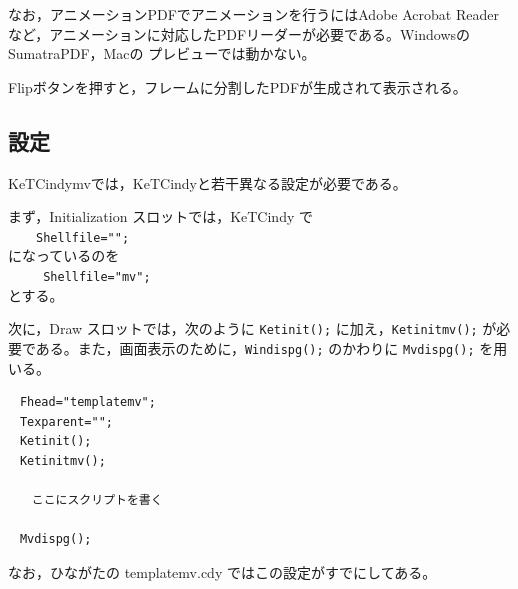 \documentclass[papersize,a4paper,12pt,uplatex]{jsarticle}
\begin{document}



なお，アニメーションPDFでアニメーションを行うにはAdobe Acrobat Reader など，アニメーションに対応したPDFリーダーが必要である。WindowsのSumatraPDF，Macの プレビューでは動かない。

Flipボタンを押すと，フレームに分割したPDFが生成されて表示される。

\subsection{設定}
KeTCindymvでは，KeTCindyと若干異なる設定が必要である。

まず，Initialization スロットでは，KeTCindy で\\
　　\verb|Shellfile="";|\\
になっているのを\\
　　\verb| Shellfile="mv";|\\
とする。

次に，Draw スロットでは，次のように \verb|Ketinit();| に加え，\verb|Ketinitmv();| が必要である。また，画面表示のために，\verb|Windispg();| のかわりに \verb|Mvdispg();| を用いる。
\begin{verbatim}
　Fhead="templatemv";
　Texparent="";
　Ketinit();
　Ketinitmv();

　　ここにスクリプトを書く

　Mvdispg();
\end{verbatim}
なお，ひながたの templatemv.cdy ではこの設定がすでにしてある。

\newpage
\end{document}
